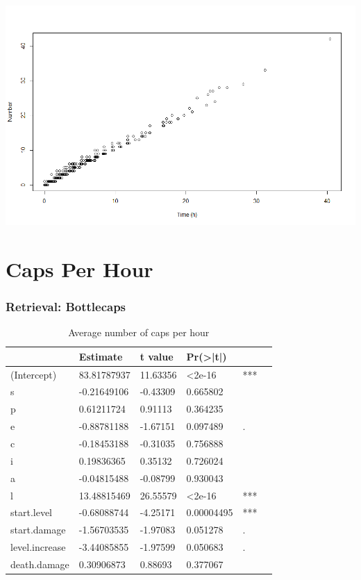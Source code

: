 \documentclass{beamer}
\begin{document}
\begin{frame}
\includegraphics[width=\textwidth]{nitems.png}
\end{frame}

\section{Caps Per Hour}
\begin{frame}
  \frametitle{Retrieval: Bottlecaps}
  \begin{table}
\caption{Average number of caps per hour}
\label{table:caps}
\begin{tabular}{l|lllll}
&Estimate&t value&Pr(>|t|)&\\  
\hline  
(Intercept)&83.81787937  &  11.63356 &<2e-16& ***\\
s &-0.21649106   & -0.43309 &    0.665802 &   \\
p&  0.61211724    & 0.91113 &   0.364235 &   \\
e & -0.88781188    &-1.67151 &   0.097489 &  . \\
c&-0.18453188  &  -0.31035  &  0.756888 &   \\
i& 0.19836365    & 0.35132  &  0.726024 &   \\
a  & -0.04815488  & -0.08799 &   0.930043&    \\
l &   13.48815469   & 26.55579&  <2e-16& ***\\
start.level &  -0.68088744   &  -4.25171 &   0.00004495 & *** \\ 
start.damage& -1.56703535   & -1.97083 &   0.051278 & . \\ 
level.increase & -3.44085855  & -1.97599 &   0.050683 &.  \\ 
death.damage & 0.30906873   &  0.88693  &  0.377067&\\
\hline
\end{tabular}
\end{table}
\end{frame}
\end{document}
